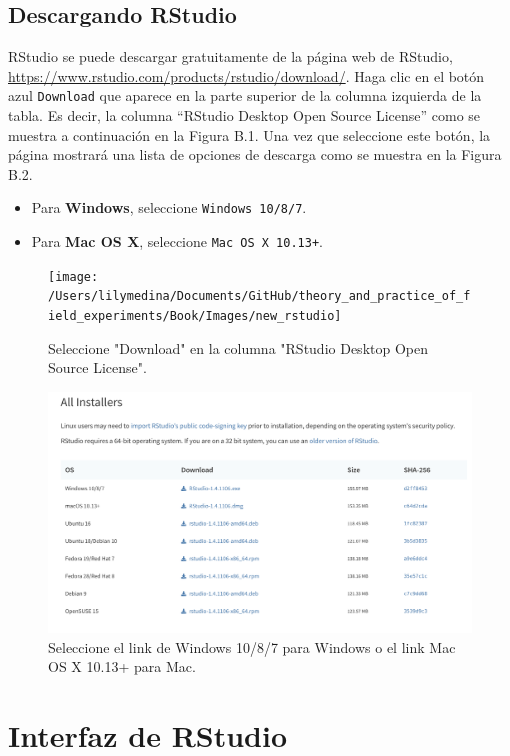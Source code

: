 \documentclass[
  12pt,
  spanish,
]{book}
\providecommand{\tightlist}{%
  \setlength{\itemsep}{0pt}\setlength{\parskip}{0pt}}
\begin{document}
\hypertarget{descargando-rstudio}{%
\subsection{Descargando RStudio}\label{descargando-rstudio}}

RStudio se puede descargar gratuitamente de la página web de RStudio, \url{https://www.rstudio.com/products/rstudio/download/}. Haga clic en el botón azul \texttt{Download} que aparece en la parte superior de la columna izquierda de la tabla. Es decir, la columna ``RStudio Desktop Open Source License'' como se muestra a continuación en la Figura B.1. Una vez que seleccione este botón, la página mostrará una lista de opciones de descarga como se muestra en la Figura B.2.

\begin{itemize}
\tightlist
\item
  Para \textbf{Windows}, seleccione \texttt{Windows\ 10/8/7}.
\item
  Para \textbf{Mac OS X}, seleccione \texttt{Mac\ OS\ X\ 10.13+}.
\end{itemize}

\begin{figure}
\texttt{[image: /Users/lilymedina/Documents/GitHub/theory\_and\_practice\_of\_field\_experiments/Book/Images/new\_rstudio]} \caption{Seleccione "Download" en la columna "RStudio Desktop Open Source License".}\label{fig:rstudiopng}
\end{figure}

\begin{figure}
\includegraphics[width=0.8\linewidth]{Images/rstudio_download} \caption{Seleccione el link de Windows 10/8/7 para Windows o el link Mac OS X 10.13+ para Mac.}\label{fig:rstudiodownload}
\end{figure}

\hypertarget{interfaz-de-rstudio}{%
\section{Interfaz de RStudio}\label{interfaz-de-rstudio}}
\end{document}
